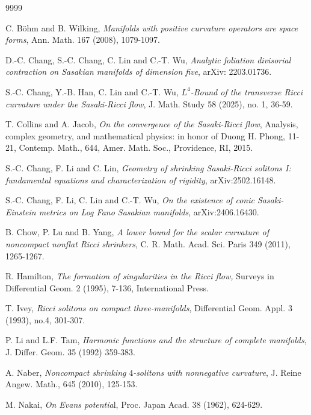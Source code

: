 \documentclass[12pt]{amsart}%
\numberwithin{equation}{section}
\begin{document}
\begin{thebibliography}{9999}                                                                                             %


C. B\"{o}hm and B. Wilking, \textit{Manifolds with positive
curvature operators are space forms}, Ann. Math. 167 (2008), 1079-1097.

D.-C. Chang, S.-C. Chang, C. Lin and C.-T. Wu,
\textit{Analytic foliation divisorial contraction on Sasakian manifolds of
dimension five}, arXiv: 2203.01736.

S.-C. Chang, Y.-B. Han, C. Lin and C.-T. Wu, $L^{4}%
$\textit{-Bound of the transverse Ricci curvature under the Sasaki-Ricci
flow}, J. Math. Study 58 (2025), no. 1, 36-59.

T. Collins and A. Jacob, \textit{On the convergence of the
Sasaki-Ricci flow}, Analysis, complex geometry, and mathematical physics: in
honor of Duong H. Phong, 11-21, Contemp. Math., 644, Amer. Math. Soc.,
Providence, RI, 2015.

S.-C. Chang, F. Li and C. Lin, \textit{Geometry of shrinking
Sasaki-Ricci solitons I: fundamental equations and characterization of
rigidity}, arXiv:2502.16148.

S.-C. Chang, F. Li, C. Lin and C.-T. Wu, \textit{On the
existence of conic Sasaki-Einstein metrics on Log Fano Sasakian manifolds}, arXiv:2406.16430.

B. Chow, P. Lu and B. Yang, \textit{A lower bound for the
scalar curvature of noncompact nonflat Ricci shrinkers}, C. R. Math. Acad.
Sci. Paris 349 (2011), 1265-1267.

R. Hamilton, \textit{The formation of singularities in the Ricci
flow,} Surveys in Differential Geom. 2 (1995), 7-136, International Press.

T. Ivey, \textit{Ricci solitons on compact three-manifolds},
Differential Geom. Appl. 3 (1993), no.4, 301-307.

P. Li and L.F. Tam, \textit{Harmonic functions and the
structure of complete manifolds}, J. Differ. Geom. 35 (1992) 359-383.

A. Naber, \textit{Noncompact shrinking }$4$\textit{-solitons
with nonnegative curvature}, J. Reine Angew. Math., 645 (2010), 125-153.

M. Nakai,\textit{ On Evans potentia}l, Proc. Japan Acad. 38
(1962), 624-629.


\end{thebibliography}
\end{document}
